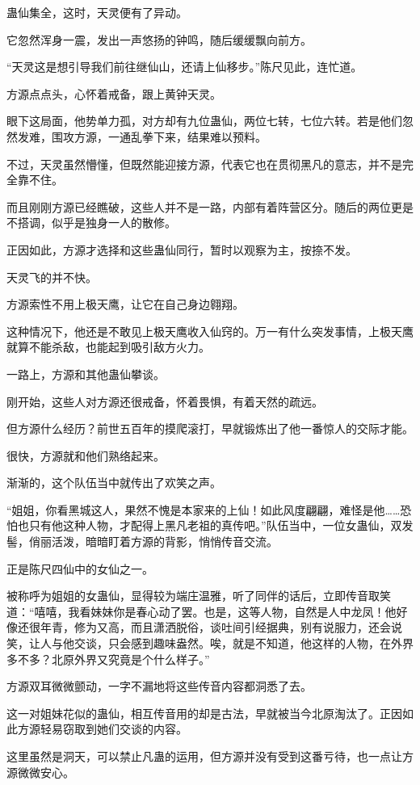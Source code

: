 \begin{this_body}
蛊仙集全，这时，天灵便有了异动。

它忽然浑身一震，发出一声悠扬的钟鸣，随后缓缓飘向前方。

“天灵这是想引导我们前往继仙山，还请上仙移步。”陈尺见此，连忙道。

方源点点头，心怀着戒备，跟上黄钟天灵。

眼下这局面，他势单力孤，对方却有九位蛊仙，两位七转，七位六转。若是他们忽然发难，围攻方源，一通乱拳下来，结果难以预料。

不过，天灵虽然懵懂，但既然能迎接方源，代表它也在贯彻黑凡的意志，并不是完全靠不住。

而且刚刚方源已经瞧破，这些人并不是一路，内部有着阵营区分。随后的两位更是不搭调，似乎是独身一人的散修。

正因如此，方源才选择和这些蛊仙同行，暂时以观察为主，按捺不发。

天灵飞的并不快。

方源索性不用上极天鹰，让它在自己身边翱翔。

这种情况下，他还是不敢见上极天鹰收入仙窍的。万一有什么突发事情，上极天鹰就算不能杀敌，也能起到吸引敌方火力。

一路上，方源和其他蛊仙攀谈。

刚开始，这些人对方源还很戒备，怀着畏惧，有着天然的疏远。

但方源什么经历？前世五百年的摸爬滚打，早就锻炼出了他一番惊人的交际才能。

很快，方源就和他们熟络起来。

渐渐的，这个队伍当中就传出了欢笑之声。

“姐姐，你看黑城这人，果然不愧是本家来的上仙！如此风度翩翩，难怪是他……恐怕也只有他这种人物，才配得上黑凡老祖的真传吧。”队伍当中，一位女蛊仙，双发髻，俏丽活泼，暗暗盯着方源的背影，悄悄传音交流。

正是陈尺四仙中的女仙之一。

被称呼为姐姐的女蛊仙，显得较为端庄温雅，听了同伴的话后，立即传音取笑道：“嘻嘻，我看妹妹你是春心动了罢。也是，这等人物，自然是人中龙凤！他好像还很年青，修为又高，而且潇洒脱俗，谈吐间引经据典，别有说服力，还会说笑，让人与他交谈，只会感到趣味盎然。唉，就是不知道，他这样的人物，在外界多不多？北原外界又究竟是个什么样子。”

方源双耳微微颤动，一字不漏地将这些传音内容都洞悉了去。

这一对姐妹花似的蛊仙，相互传音用的却是古法，早就被当今北原淘汰了。正因如此方源轻易窃取到她们交谈的内容。

这里虽然是洞天，可以禁止凡蛊的运用，但方源并没有受到这番亏待，也一点让方源微微安心。


\end{this_body}
